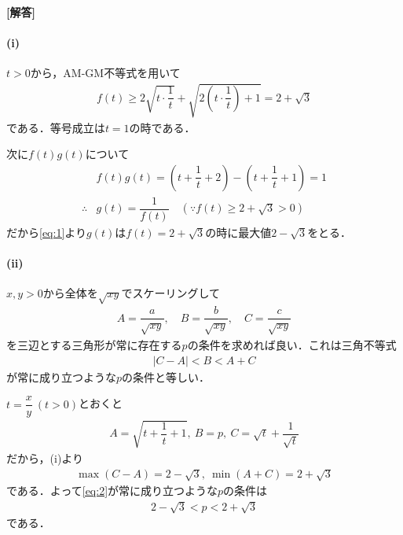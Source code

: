 \documentclass[../../main.tex]{subfiles}
\begin{document}
\begin{oframed}
  
\end{oframed}

{\bf [解答]}

\paragraph{(i)}

$t > 0$から，AM-GM不等式を用いて
\begin{align}
  f(t) \ge 2\sqrt{t \cdot \dfrac{1}{t}} + \sqrt{2\left(t \cdot \dfrac{1}{t}\right) + 1} = 2 + \sqrt{3} \label{eq:1}
\end{align}
である．等号成立は$t=1$の時である．

次に$f(t)g(t)$について
\begin{align}
  & f(t)g(t) = \left(t+\dfrac{1}{t}+2\right) - \left(t+\dfrac{1}{t}+1\right) = 1 \\
  \therefore
  & g(t) = \dfrac{1}{f(t)} \quad (\because f(t) \ge 2+\sqrt{3} > 0)
\end{align}
だから\cref{eq:1}より$g(t)$は$f(t) = 2+\sqrt{3}$の時に最大値$2-\sqrt{3}$をとる．

\paragraph{(ii)}

$x, y > 0$から全体を$\sqrt{xy}$でスケーリングして
\begin{align}
  A = \dfrac{a}{\sqrt{xy}}, \quad
  B = \dfrac{b}{\sqrt{xy}}, \quad
  C = \dfrac{c}{\sqrt{xy}}
\end{align}
を三辺とする三角形が常に存在する$p$の条件を求めれば良い．これは三角不等式
\begin{align}
  |C-A| < B < A + C \label{eq:2}
\end{align}
が常に成り立つような$p$の条件と等しい．

$t = \dfrac{x}{y} \ (t>0)$とおくと
\begin{align}
  A = \sqrt{t+\dfrac{1}{t}+1}, \ B = p, \ C = \sqrt{t} + \dfrac{1}{\sqrt{t}}
\end{align}
だから，(i)より
\begin{align}
  \max(C-A) = 2-\sqrt{3}, \ \min(A+C) = 2+\sqrt{3} \label{eq:3}
\end{align}
である．よって\cref{eq:2}が常に成り立つような$p$の条件は
\begin{align}
  2-\sqrt{3} < p < 2+\sqrt{3}
\end{align}
である．
\end{document}
